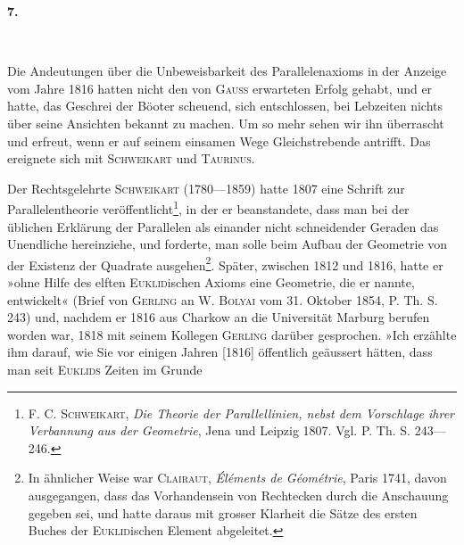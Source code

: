 \clearpage\begingroup{}
\renewcommand{\thefootnote}{\arabic{footnote})}\setcounter{footnote}{0}
\begin{center}
\par\medskip
\textbf{7.}\par\smallskip
{}\\
\end{center}
\noindent\hspace*{\parindent}Die Andeutungen über die Unbeweisbarkeit des Parallelenaxioms in der
Anzeige vom Jahre 1816 hatten nicht den von \textsc{Gauss} erwarteten Erfolg gehabt,
und er hatte, das Geschrei der Böoter scheuend, sich entschlossen, bei
Lebzeiten nichts über seine Ansichten bekannt zu machen. Um so mehr
sehen wir ihn überrascht und erfreut, wenn er auf seinem einsamen Wege
Gleichstrebende antrifft. Das ereignete sich mit \textsc{Schweikart} und \textsc{Taurinus}.
\par
Der Rechtsgelehrte \textsc{Schweikart} (1780—1859) hatte 1807 eine Schrift zur
Parallelentheorie veröffentlicht\footnote{F. C. \textsc{Schweikart}, \textit{Die Theorie der Parallellinien, nebst dem Vorschlage ihrer Verbannung aus der Geometrie}, Jena und Leipzig 1807. Vgl. P. Th. S. 243—246.}, in der er beanstandete, dass man bei der
üblichen Erklärung der Parallelen als einander nicht schneidender Geraden
das Unendliche hereinziehe, und forderte, man solle beim Aufbau der Geometrie
von der Existenz der Quadrate ausgehen\footnote{In ähnlicher Weise war \textsc{Clairaut}, \textit{Éléments de Géométrie}, Paris 1741, davon ausgegangen, dass das Vorhandensein von Rechtecken durch die Anschauung gegeben sei, und hatte daraus mit grosser Klarheit die Sätze des ersten Buches der \textsc{Euklid}ischen Element abgeleitet.}. Später, zwischen 1812 und 1816,
hatte er »ohne Hilfe des elften \textsc{Euklid}ischen Axioms eine Geometrie, die er
 nannte, entwickelt« (Brief von \textsc{Gerling} an W. \textsc{Bolyai} vom
31. Oktober 1854, P. Th. S. 243) und, nachdem er 1816 aus Charkow an die
\clearpage{}\setcounter{footnote}{0}
\noindent Universität Marburg berufen worden war, 1818 mit seinem Kollegen \textsc{Gerling}
darüber gesprochen. »Ich erzählte ihm darauf, wie Sie vor einigen Jahren
[1816] öffentlich geäussert hätten, dass man seit \textsc{Euklids} Zeiten im Grunde
